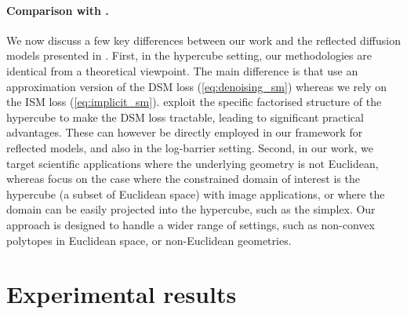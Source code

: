 \paragraph{Comparison with \cite{lou2023reflected}.}
We now discuss a few key differences between our work and the reflected diffusion models presented in \cite{lou2023reflected}.
First, in the hypercube setting, our methodologies are identical from a theoretical viewpoint.
The main difference is that \cite{lou2023reflected} use an approximation version of the DSM loss (\ref{eq:denoising_sm}) whereas we rely on the ISM loss (\ref{eq:implicit_sm}).
\textcite{lou2023reflected} exploit the specific factorised structure of the hypercube to make the DSM loss tractable, leading to significant practical advantages.
These can however be directly employed in our framework for reflected models, and also in the log-barrier setting.
Second, in our work, we target scientific applications where the underlying geometry is not Euclidean, whereas \cite{lou2023reflected} focus on the case where the constrained domain of interest is the hypercube (a subset of Euclidean space) with image applications, or where the domain can be easily projected into the hypercube, such as the simplex.
Our approach is designed to handle a wider range of settings, such as non-convex polytopes in Euclidean space, or non-Euclidean geometries.

\section{Experimental results}
\label{sec:experiments-constrained}


